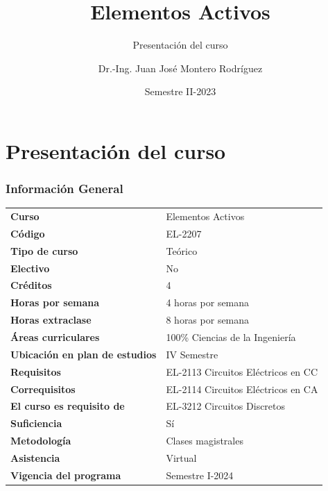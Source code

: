 \documentclass[10pt,t,aspectratio=169]{beamer}
\title{Elementos Activos}
\subtitle{Presentación del curso}
\author{Dr.-Ing. Juan José Montero Rodríguez}
\institute{Escuela de Ingeniería Electrónica}
\date{Semestre II-2023}
\begin{document}
\section{Presentación del curso}

\begin{frame}[t]
\titlepage
\end{frame}

\begin{frame}[t]
\frametitle{Información General}%
\begin{table}[H]
	\flushleft
	\begin{tabular}{ll}
	\textbf{Curso} & Elementos Activos \\
	\textbf{Código} & EL-2207 \\
	\textbf{Tipo de curso} & Teórico \\
	\textbf{Electivo} & No \\
	\textbf{Créditos} & 4 \\
	\textbf{Horas por semana} & 4 horas por semana \\
	\textbf{Horas extraclase} & 8 horas por semana \\
	\textbf{Áreas curriculares} & 100\% Ciencias de la Ingeniería \\
	\textbf{Ubicación en plan de estudios} & IV Semestre \\
	\textbf{Requisitos} & EL-2113 Circuitos Eléctricos en CC \\
	\textbf{Correquisitos} & EL-2114 Circuitos Eléctricos en CA \\
	\textbf{El curso es requisito de} & EL-3212 Circuitos Discretos \\
	\textbf{Suficiencia} & Sí \\
	\textbf{Metodología} & Clases magistrales \\
	\textbf{Asistencia} & Virtual \\
	\textbf{Vigencia del programa} & Semestre I-2024
	\end{tabular}
\end{table}
\end{frame}
\end{document}

